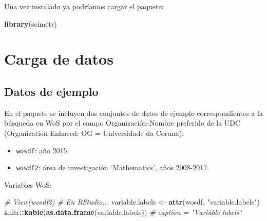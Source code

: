 \documentclass[
]{book}
\newenvironment{Shaded}{\begin{snugshade}}{\end{snugshade}}
\newcommand{\CommentTok}[1]{\textcolor[rgb]{0.56,0.35,0.01}{\textit{#1}}}
\newcommand{\FunctionTok}[1]{\textcolor[rgb]{0.13,0.29,0.53}{\textbf{#1}}}
\newcommand{\NormalTok}[1]{#1}
\newcommand{\OtherTok}[1]{\textcolor[rgb]{0.56,0.35,0.01}{#1}}
\newcommand{\SpecialCharTok}[1]{\textcolor[rgb]{0.81,0.36,0.00}{\textbf{#1}}}
\newcommand{\StringTok}[1]{\textcolor[rgb]{0.31,0.60,0.02}{#1}}
\begin{document}
Una vez instalado ya podríamos cargar el paquete:

\begin{Shaded}
\begin{Highlighting}[]
\FunctionTok{library}\NormalTok{(scimetr)}
\end{Highlighting}
\end{Shaded}

\hypertarget{carga-de-datos}{%
\section{Carga de datos}\label{carga-de-datos}}

\hypertarget{datos-de-ejemplo}{%
\subsection{Datos de ejemplo}\label{datos-de-ejemplo}}

En el paquete se incluyen dos conjuntos de datos de ejemplo
correspondientes a la búsqueda en WoS
por el campo Organización-Nombre preferido de la UDC
(Organization-Enhaced: OG = Universidade da Coruna):

\begin{itemize}
\item
  \texttt{wosdf}: año 2015.
\item
  \texttt{wosdf2}: área de investigación `Mathematics', años 2008-2017.
\end{itemize}

Variables WoS:

\begin{Shaded}
\begin{Highlighting}[]
\CommentTok{\# View(wosdf2) \# En RStudio...}
\NormalTok{variable.labels }\OtherTok{\textless{}{-}} \FunctionTok{attr}\NormalTok{(wosdf, }\StringTok{"variable.labels"}\NormalTok{)}
\NormalTok{knitr}\SpecialCharTok{::}\FunctionTok{kable}\NormalTok{(}\FunctionTok{as.data.frame}\NormalTok{(variable.labels)) }\CommentTok{\# caption = "Variable labels"}
\end{Highlighting}
\end{Shaded}
\end{document}

